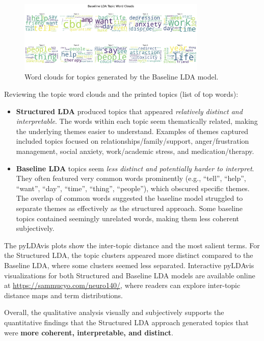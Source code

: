 \documentclass{article}
\begin{document}
\begin{figure}[ht]
    \centering
    \includegraphics[width=0.8\textwidth]{plots/BaselineLDATopicWordClouds.jpeg}
    \caption{Word clouds for topics generated by the Baseline LDA model.}
    \label{fig:wordcloud-baseline}
\end{figure}

Reviewing the topic word clouds and the printed topics (list of top words):
\begin{itemize}[leftmargin=*]
    \item \textbf{Structured LDA} produced topics that appeared \emph{relatively distinct and interpretable}. The words within each topic seem thematically related, making the underlying themes easier to understand. Examples of themes captured included topics focused on relationships/family/support, anger/frustration management, social anxiety, work/academic stress, and medication/therapy.
    \item \textbf{Baseline LDA} topics seem \emph{less distinct and potentially harder to interpret}. They often featured very common words prominently (e.g., ``tell'', ``help'', ``want'', ``day'', ``time'', ``thing'', ``people''), which obscured specific themes. The overlap of common words suggested the baseline model struggled to separate themes as effectively as the structured approach. Some baseline topics contained seemingly unrelated words, making them less coherent subjectively.
\end{itemize}

The pyLDAvis plots show the inter-topic distance and the most salient terms. For the Structured LDA, the topic clusters appeared more distinct compared to the Baseline LDA, where some clusters seemed less separated. Interactive pyLDAvis visualizations for both Structured and Baseline LDA models are available online at \url{https://sammucyo.com/neuro140/}, where readers can explore inter-topic distance maps and term distributions.

Overall, the qualitative analysis visually and subjectively supports the quantitative findings that the Structured LDA approach generated topics that were \textbf{more coherent, interpretable, and distinct}.
\end{document}

